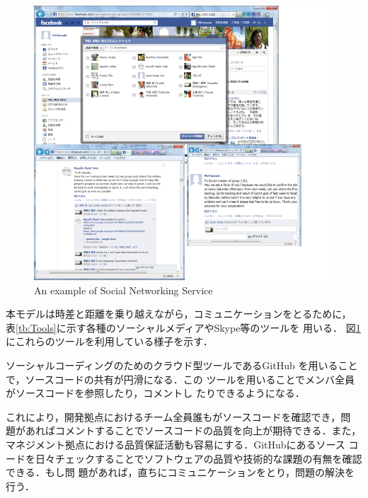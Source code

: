 \documentclass[a4j, 12Q, twocolumn, twoside]{jsarticle}
\begin{document}
\begin{figure}
  \begin{center}
   \includegraphics[width=\columnwidth]{./figures/SNS.png}
   \caption{An example of Social Networking Service}
   \label{fig:SNS}
  \end{center}
\end{figure}


本モデルは時差と距離を乗り越えながら，コミュニケーションをとるために，
表\ref{tb:Tools}に示す各種のソーシャルメディアやSkype等のツールを
用いる．
図\ref{fig:SNS}
にこれらのツールを利用している様子を示す．

ソーシャルコーディングのためのクラウド型ツールであるGitHub
を用いることで，ソースコードの共有が円滑になる．この
ツールを用いることでメンバ全員がソースコードを参照したり，コメントし
たりできるようになる．

これにより，開発拠点におけるチーム全員誰もがソースコードを確認でき，問
題があればコメントすることでソースコードの品質を向上が期待できる．また，
マネジメント拠点における品質保証活動も容易にする．GitHubにあるソース
コードを日々チェックすることでソフトウェアの品質や技術的な課題の有無を確認できる．もし問
題があれば，直ちにコミュニケーションをとり，問題の解決を行う．
\end{document}
